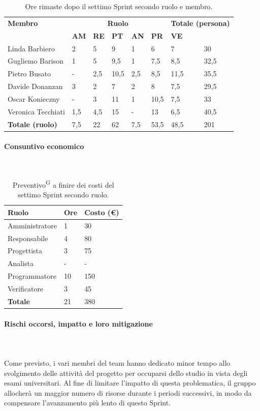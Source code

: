 \documentclass[8pt]{article}
\newcommand{\glossterm}[1]{#1\textsuperscript{G}} %
\newcommand{\subsubsubsection}[1]{\paragraph{#1}\mbox{}\\}
\begin{document}
\begin{table}[ht!]
	\centering
	\begin{tabular}{p{3cm} p{1.4cm} p{1.6cm} p{1.5cm} p{1.5cm} p{1.5cm} p{1.5cm} p{2cm}}
		\toprule
        \textbf{Membro} & \multicolumn{5}{c}{\textbf{Ruolo}} & \multicolumn{2}{r}{\textbf{Totale (persona)}}\\
		& \textbf{AM} & \textbf{RE} & \textbf{PT} & \textbf{AN} & \textbf{PR} & \textbf{VE}\\
		\midrule
        Linda Barbiero     & 2   & 5   & 9    & 1   & 6    & 7    & 30 \\
        Gugliemo Barison   & 1   & 5   & 9,5  & 1   & 7,5  & 8,5  & 32,5 \\
        Pietro Busato      & -   & 2,5 & 10,5 & 2,5 & 8,5  & 11,5 & 35,5 \\
        Davide Donanzan    & 3   & 2   & 7    & 2   & 8    & 7,5  & 29,5 \\
        Oscar Konieczny    & -   & 3   & 11   & 1   & 10,5 & 7,5  & 33 \\
        Veronica Tecchiati & 1,5 & 4,5 & 15   & -   & 13   & 6,5  & 40,5 \\
        \midrule
        \textbf{Totale (ruolo)} & 7,5 & 22 & 62 & 7,5 & 53,5 & 48,5 & 201 \\
		\bottomrule
	\end{tabular}
	\caption{Ore rimaste dopo il settimo Sprint secondo ruolo e membro.}
	\label{table:Ore rimaste dopo il settimo Sprint secondo ruolo e membro}
\end{table}
\clearpage
\subsubsubsection{Consuntivo economico}
\begin{table}[ht!]
    \centering
    \begin{tabular}{p{4cm} p{1.8cm} p{2.2cm}}
        \toprule
        \textbf{Ruolo} & \textbf{Ore} & \textbf{Costo (€)} \\
        \midrule
        Amministratore & 1  & 30  \\
        Responsabile   & 4  & 80  \\
        Progettista    & 3  & 75  \\
        Analista       & -  & -   \\
        Programmatore  & 10 & 150 \\
        Verificatore   & 3  & 45  \\
        \bottomrule
        \textbf{Totale} & 21 & 380
    \end{tabular}
    \caption{\glossterm{Preventivo} a finire dei costi del settimo Sprint secondo ruolo.}
    \label{table:Preventivo a finire dei costi del settimo Sprint secondo ruolo}
\end{table}
\subsubsubsection{Rischi occorsi, impatto e loro mitigazione} \\
Come previsto, i vari membri del team hanno dedicato minor tempo allo svolgimento delle attività del progetto per occuparsi dello studio in vista degli esami universitari. Al fine di limitare l'impatto di questa problematica, il gruppo allocherà un maggior numero di risorse durante i periodi successivi, in modo da compensare l'avanzamento più lento di questo Sprint. 
\end{document}
